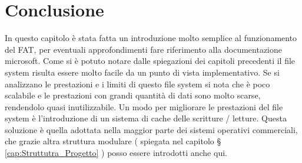     \section{Conclusione}
    In questo capitolo è stata fatta un introduzione molto semplice al funzionamento del FAT, per eventuali approfondimenti fare riferimento alla documentazione microsoft. 
     Come si è potuto notare dalle spiegazioni dei capitoli precedenti il file system risulta essere molto facile da un punto di vista implementativo. 
      Se si analizzano le prestazioni e i limiti di questo file system      si nota che è poco scalabile e le prestazioni con grandi quantità di dati sono molto scarse, rendendolo quasi inutilizzabile. 
     Un modo per migliorare le prestazioni del file system è l'introduzione di un sistema di cache delle scritture / letture. Questa soluzione è quella adottata nella maggior parte dei sistemi operativi commerciali, 
     che grazie altra struttura modulare ( spiegata nel capitolo § \ref{cap:Struttutra_Progetto} ) posso essere introdotti anche qui. 
      
\clearpage{\pagestyle{empty}\cleardoublepage}

